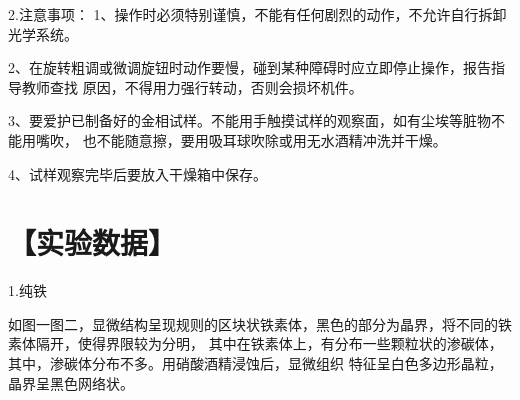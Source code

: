 \documentclass[a4paper,utf8]{article}
\begin{document}
2.注意事项：
1、操作时必须特别谨慎，不能有任何剧烈的动作，不允许自行拆卸光学系统。

2、在旋转粗调或微调旋钮时动作要慢，碰到某种障碍时应立即停止操作，报告指导教师查找
原因，不得用力强行转动，否则会损坏机件。

3、要爱护已制备好的金相试样。不能用手触摸试样的观察面，如有尘埃等脏物不能用嘴吹，
也不能随意擦，要用吸耳球吹除或用无水酒精冲洗并干燥。

4、试样观察完毕后要放入干燥箱中保存。

\section*{【实验数据】}

1.纯铁

如图一图二，显微结构呈现规则的区块状铁素体，黑色的部分为晶界，将不同的铁素体隔开，使得界限较为分明，
其中在铁素体上，有分布一些颗粒状的渗碳体，其中，渗碳体分布不多。用硝酸酒精浸蚀后，显微组织
特征呈白色多边形晶粒，晶界呈黑色网络状。
\begin{figure}[!ht]
    \begin{floatrow}
    \end{floatrow}

\end{figure}
\end{document}
